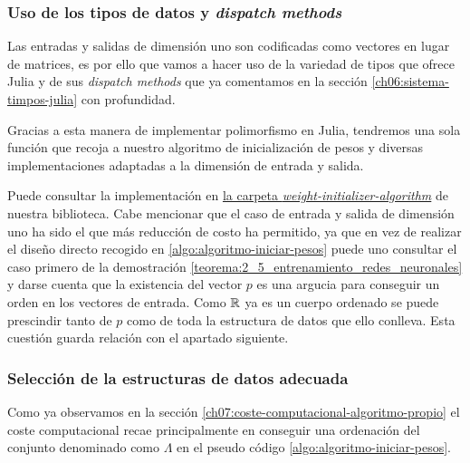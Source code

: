 \subsubsection{ Uso de los tipos de datos y \textit{ dispatch methods}}
Las entradas y salidas de dimensión uno son codificadas como vectores en lugar de matrices, 
es por ello que vamos a hacer uso de la variedad de tipos que ofrece Julia y de sus \textit{dispatch methods} que ya comentamos en 
la sección \ref{ch06:sistema-timpos-julia} con
 profundidad. 

 Gracias a esta manera de implementar polimorfismo 
 en Julia, tendremos una sola función que recoja a 
 nuestro algoritmo de inicialización de pesos y diversas implementaciones adaptadas a la dimensión de entrada y salida. 

 Puede consultar la implementación en \href{https://github.com/BlancaCC/TFG-Estudio-de-las-redes-neuronales/tree/main/OptimimizedNeuralNetwork.jl/src}{la carpeta \textit{weight-initializer-algorithm}} de nuestra biblioteca. 
 Cabe mencionar que el caso de entrada y salida de dimensión uno ha sido el que más reducción de costo 
 ha permitido, ya que en vez de realizar 
 el diseño directo recogido en \ref{algo:algoritmo-iniciar-pesos} puede uno consultar 
 el caso primero de la demostración  \ref{teorema:2_5_entrenamiento_redes_neuronales}
 y darse cuenta que la existencia del vector $p$ 
 es una argucia para conseguir un orden en los vectores de entrada. Como $\mathbb{R}$ ya es un cuerpo ordenado se puede prescindir tanto de $p$ como de toda la estructura de datos que ello conlleva. 
 Esta cuestión guarda relación con el apartado siguiente. 

\subsubsection{Selección de la estructuras de datos adecuada}
Como ya observamos en  la sección \ref{ch07:coste-computacional-algoritmo-propio} el coste computacional recae principalmente en conseguir una ordenación del conjunto denominado como 
$\Lambda$ en el pseudo código \ref{algo:algoritmo-iniciar-pesos}. 

